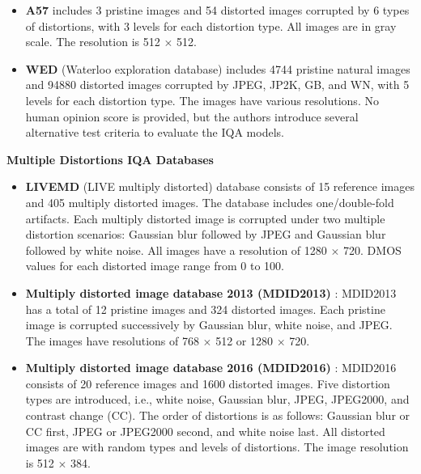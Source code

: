 \begin{itemize}
    \item \textbf{A57} \autocite{A57} includes 3 pristine images and 54 distorted images corrupted by 6 types of distortions, with 3 levels for each distortion type. All images are in gray scale. The resolution is 512 $\times$ 512. 
    \item \textbf{WED} (Waterloo exploration database) \autocite{WED} includes 4744 pristine natural images and 94880 distorted images corrupted by JPEG, JP2K, GB, and WN, with 5 levels for each distortion type. The images have various resolutions. No human opinion score is provided, but the authors introduce several alternative test criteria to evaluate the IQA models.
\end{itemize}

\textbf{Multiple Distortions IQA Databases}
\begin{itemize}
    \item \textbf{LIVEMD} (LIVE multiply distorted) \autocite{LIVEMD} database consists of 15 reference images and 405 multiply distorted images. The database includes one/double-fold artifacts. Each multiply distorted image is corrupted under two multiple distortion scenarios: Gaussian blur followed by JPEG and Gaussian blur followed by white noise. All images have a resolution of 1280 $\times$ 720. DMOS values for each distorted image range from 0 to 100.
    \item \textbf{Multiply distorted image database 2013 (MDID2013)} \autocite{MDID2013}: MDID2013 has a total of 12 pristine images and 324 distorted images. Each pristine image is corrupted successively by Gaussian blur, white noise, and JPEG. The images have resolutions of 768 $\times$ 512 or 1280 $\times$ 720.
    \item \textbf{Multiply distorted image database 2016 (MDID2016)} \autocite{MDID2016}: MDID2016 consists of 20 reference images and 1600 distorted images. Five distortion types are introduced, i.e., white noise, Gaussian blur, JPEG, JPEG2000, and contrast change (CC). The order of distortions is as follows: Gaussian blur or CC first, JPEG or JPEG2000 second, and white noise last. All distorted images are with random types and levels of distortions. The image resolution is 512 $\times$ 384.
\end{itemize}

